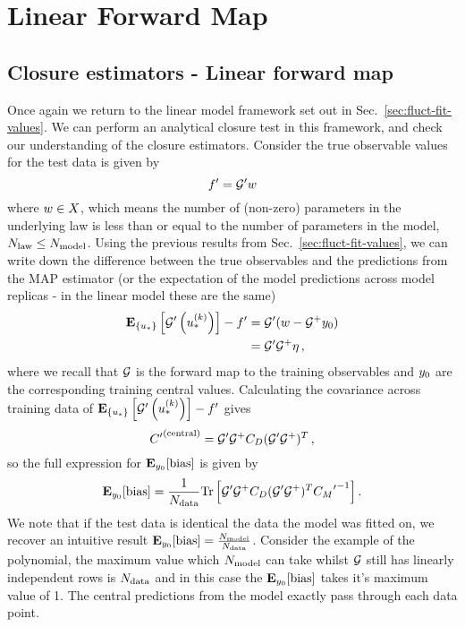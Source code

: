\section{Linear Forward Map}

\subsection{Closure estimators - Linear forward map}

Once again we return to the linear model framework set out in
Sec.~\ref{sec:fluct-fit-values}. We can perform an analytical closure
test in this framework, and check our
understanding of the closure estimators. Consider the true observable
values for the test data is given by
\begin{equation}\label{eq:LinearLawMap}
    {{f}^{\prime}} = {{\mathcal{G}}^{\prime}} w
\end{equation}
where $w \in X$, which means the number of (non-zero) parameters
in the underlying law is less than or equal to the number of parameters in the
model, $N_{\rm law} \leq N_{\rm model}$. Using the previous results from
Sec.~\ref{sec:fluct-fit-values}, we can write down the
difference between the true observables and the predictions from the MAP estimator
(or the expectation of the model predictions across model replicas - in the
linear model these are the same)
\begin{equation}
    \begin{split}
        \mathbf{E}_{\{ u_* \}} \left[ {{\mathcal{G}}^{\prime}}\left(u_*^{(k)}\right) \right] - {{f}^{\prime}} &=
        {{\mathcal{G}}^{\prime}} (w - \mathcal{G}^+ y_0 ) \\
        &= {{\mathcal{G}}^{\prime}} \mathcal{G}^+ \eta \, ,
    \end{split}
\end{equation}
where we recall that $\mathcal{G}$ is the forward map to the training observables
and $y_0$ are
the corresponding training central values. Calculating the covariance across
training data of
$\mathbf{E}_{\{ u_* \}} \left[ {{\mathcal{G}}^{\prime}}\left(u_*^{(k)}\right) \right] - {{f}^{\prime}}$
gives
\begin{equation}
    {{C}^{\prime}}^{(\rm central)} = {{\mathcal{G}}^{\prime}} \mathcal{G}^+ C_{D} ({{\mathcal{G}}^{\prime}} \mathcal{G}^+)^T \, ,
\end{equation}
so the full expression for $\mathbf{E}_{y_0}[{\rm bias}]$ is given by
\begin{equation}
    \mathbf{E}_{y_0}[{\rm bias}] = \frac{1}{N_{\rm data}}
    {\rm Tr} \left[
        {{\mathcal{G}}^{\prime}} \mathcal{G}^+ C_{D} ({{\mathcal{G}}^{\prime}} \mathcal{G}^+)^T
        {{C_M}^{\prime}}^{-1}
    \right].
\end{equation}
We note that if the test data is identical the data the model was fitted on,
we recover an intuitive result $\mathbf{E}_{y_0}[{\rm bias}] = \frac{N_{\rm model}}{N_{\rm data}}$.
Consider the example of the polynomial, the maximum value which $N_{\rm model}$ can
take whilst $\mathcal{G}$ still has linearly independent rows is $N_{\rm data}$ and in this case
the $\mathbf{E}_{y_0}[{\rm bias}]$ takes it's maximum value of 1. The central
predictions from the model exactly pass through each data point.

